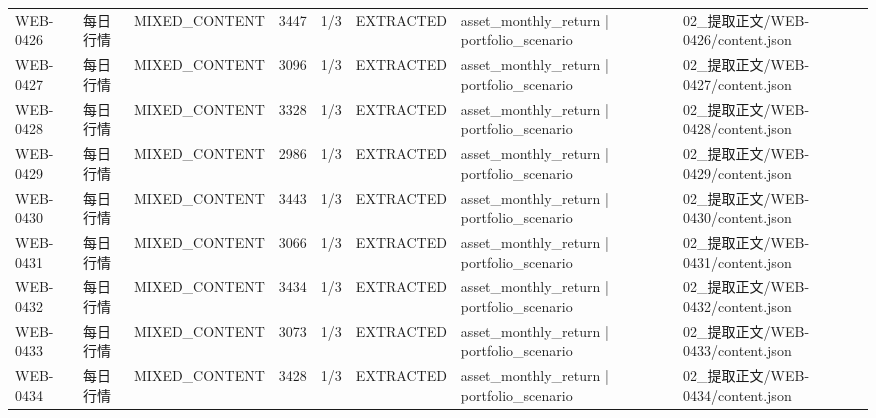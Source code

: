 \begin{landscape}
\begin{longtable}{p{1.8cm}p{4.2cm}p{3.0cm}p{1.4cm}p{1.6cm}p{2.4cm}p{4.2cm}p{4.2cm}}
WEB-0426 & 每日行情 & MIXED\_\allowbreak{}CONTENT & 3447 & 1/\allowbreak{}3 & EXTRACTED & asset\_\allowbreak{}monthly\_\allowbreak{}return | portfolio\_\allowbreak{}scenario & 02\_\allowbreak{}提取正文/\allowbreak{}WEB-0426/\allowbreak{}content.json\\
WEB-0427 & 每日行情 & MIXED\_\allowbreak{}CONTENT & 3096 & 1/\allowbreak{}3 & EXTRACTED & asset\_\allowbreak{}monthly\_\allowbreak{}return | portfolio\_\allowbreak{}scenario & 02\_\allowbreak{}提取正文/\allowbreak{}WEB-0427/\allowbreak{}content.json\\
WEB-0428 & 每日行情 & MIXED\_\allowbreak{}CONTENT & 3328 & 1/\allowbreak{}3 & EXTRACTED & asset\_\allowbreak{}monthly\_\allowbreak{}return | portfolio\_\allowbreak{}scenario & 02\_\allowbreak{}提取正文/\allowbreak{}WEB-0428/\allowbreak{}content.json\\
WEB-0429 & 每日行情 & MIXED\_\allowbreak{}CONTENT & 2986 & 1/\allowbreak{}3 & EXTRACTED & asset\_\allowbreak{}monthly\_\allowbreak{}return | portfolio\_\allowbreak{}scenario & 02\_\allowbreak{}提取正文/\allowbreak{}WEB-0429/\allowbreak{}content.json\\
WEB-0430 & 每日行情 & MIXED\_\allowbreak{}CONTENT & 3443 & 1/\allowbreak{}3 & EXTRACTED & asset\_\allowbreak{}monthly\_\allowbreak{}return | portfolio\_\allowbreak{}scenario & 02\_\allowbreak{}提取正文/\allowbreak{}WEB-0430/\allowbreak{}content.json\\
WEB-0431 & 每日行情 & MIXED\_\allowbreak{}CONTENT & 3066 & 1/\allowbreak{}3 & EXTRACTED & asset\_\allowbreak{}monthly\_\allowbreak{}return | portfolio\_\allowbreak{}scenario & 02\_\allowbreak{}提取正文/\allowbreak{}WEB-0431/\allowbreak{}content.json\\
WEB-0432 & 每日行情 & MIXED\_\allowbreak{}CONTENT & 3434 & 1/\allowbreak{}3 & EXTRACTED & asset\_\allowbreak{}monthly\_\allowbreak{}return | portfolio\_\allowbreak{}scenario & 02\_\allowbreak{}提取正文/\allowbreak{}WEB-0432/\allowbreak{}content.json\\
WEB-0433 & 每日行情 & MIXED\_\allowbreak{}CONTENT & 3073 & 1/\allowbreak{}3 & EXTRACTED & asset\_\allowbreak{}monthly\_\allowbreak{}return | portfolio\_\allowbreak{}scenario & 02\_\allowbreak{}提取正文/\allowbreak{}WEB-0433/\allowbreak{}content.json\\
WEB-0434 & 每日行情 & MIXED\_\allowbreak{}CONTENT & 3428 & 1/\allowbreak{}3 & EXTRACTED & asset\_\allowbreak{}monthly\_\allowbreak{}return | portfolio\_\allowbreak{}scenario & 02\_\allowbreak{}提取正文/\allowbreak{}WEB-0434/\allowbreak{}content.json\\

\end{longtable}
\end{landscape}
